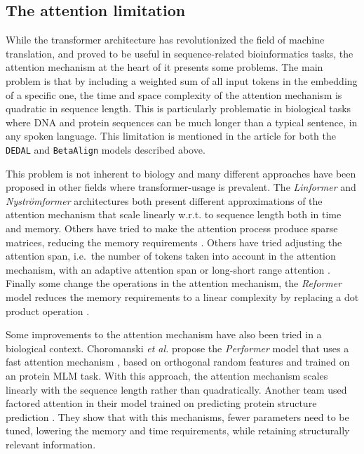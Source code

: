 \documentclass[
  11pt,
  twoside,
  BCOR=10mm,
  listof=totoc]{scrbook}
\begin{document}
\hypertarget{the-attention-limitation}{%
\subsection{The attention limitation}\label{the-attention-limitation}}

While the transformer architecture has revolutionized the field of machine translation, and proved to be useful in sequence-related bioinformatics tasks, the attention mechanism at the heart of it presents some problems. The main problem is that by including a weighted sum of all input tokens in the embedding of a specific one, the time and space complexity of the attention mechanism is quadratic in sequence length. This is particularly problematic in biological tasks where DNA and protein sequences can be much longer than a typical sentence, in any spoken language. This limitation is mentioned in the article for both the \texttt{DEDAL} and \texttt{BetaAlign} models described above.

This problem is not inherent to biology and many different approaches have been proposed in other fields where transformer-usage is prevalent. The \emph{Linformer} \autocite{wangLinformerSelfAttentionLinear2020} and \emph{Nyströmformer} \autocite{xiongNystromformerNystrombasedAlgorithm2021} architectures both present different approximations of the attention mechanism that scale linearly w.r.t. to sequence length both in time and memory. Others have tried to make the attention process produce sparse matrices, reducing the memory requirements \autocite{childGeneratingLongSequences2019,correiaAdaptivelySparseTransformers2019}. Others have tried adjusting the attention span, i.e.~the number of tokens taken into account in the attention mechanism, with an adaptive attention span \autocite{sukhbaatarAdaptiveAttentionSpan2019} or long-short range attention \autocite{wuLiteTransformerLongShort2020}. Finally some change the operations in the attention mechanism, the \emph{Reformer} model reduces the memory requirements to a linear complexity by replacing a dot product operation \autocite{kitaevReformerEfficientTransformer2020}.

Some improvements to the attention mechanism have also been tried in a biological context. Choromanski \emph{et al.} propose the \emph{Performer} model that uses a fast attention mechanism \autocite{choromanskiMaskedLanguageModeling2020}, based on orthogonal random features and trained on an protein MLM task. With this approach, the attention mechanism scales linearly with the sequence length rather than quadratically. Another team used factored attention in their model trained on predicting protein structure prediction \autocite{bhattacharyaInterpretingPottsTransformer2021}. They show that with this mechanisms, fewer parameters need to be tuned, lowering the memory and time requirements, while retaining structurally relevant information.
\end{document}

